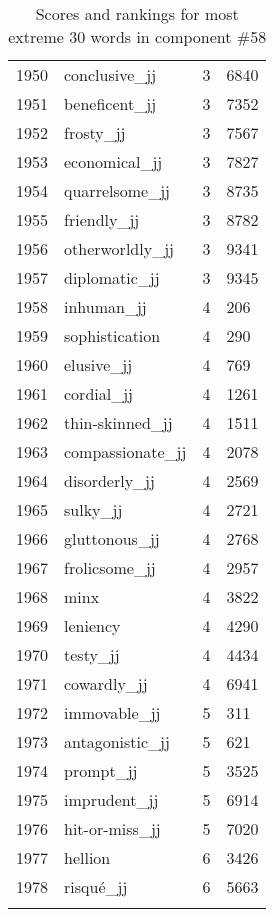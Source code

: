 \begin{longtable}[!htbp]{| rlr@{.}l |}
    1950 & conclusive\_jj & 3 & 6840 \\
    1951 & beneficent\_jj & 3 & 7352 \\
    1952 & frosty\_jj & 3 & 7567 \\
    1953 & economical\_jj & 3 & 7827 \\
    1954 & quarrelsome\_jj & 3 & 8735 \\
    1955 & friendly\_jj & 3 & 8782 \\
    1956 & otherworldly\_jj & 3 & 9341 \\
    1957 & diplomatic\_jj & 3 & 9345 \\
    1958 & inhuman\_jj & 4 & 206 \\
    1959 & sophistication & 4 & 290 \\
    1960 & elusive\_jj & 4 & 769 \\
    1961 & cordial\_jj & 4 & 1261 \\
    1962 & thin-skinned\_jj & 4 & 1511 \\
    1963 & compassionate\_jj & 4 & 2078 \\
    1964 & disorderly\_jj & 4 & 2569 \\
    1965 & sulky\_jj & 4 & 2721 \\
    1966 & gluttonous\_jj & 4 & 2768 \\
    1967 & frolicsome\_jj & 4 & 2957 \\
    1968 & minx & 4 & 3822 \\
    1969 & leniency & 4 & 4290 \\
    1970 & testy\_jj & 4 & 4434 \\
    1971 & cowardly\_jj & 4 & 6941 \\
    1972 & immovable\_jj & 5 & 311 \\
    1973 & antagonistic\_jj & 5 & 621 \\
    1974 & prompt\_jj & 5 & 3525 \\
    1975 & imprudent\_jj & 5 & 6914 \\
    1976 & hit-or-miss\_jj & 5 & 7020 \\
    1977 & hellion & 6 & 3426 \\
    1978 & risqué\_jj & 6 & 5663 \\
    \hline
    \caption{Scores and rankings for most extreme 30 words in component \#58} \\
\end{longtable}
